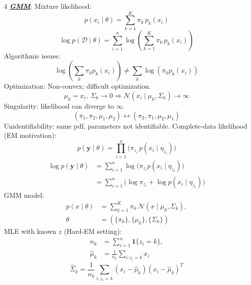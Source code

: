 \documentclass[12pt]{article}
\newcommand{\bulletPoint}[1]{\ul{\textit{\textbf{#1}}}}
\begin{document}
\begin{multicols*}{4}
\bulletPoint{GMM}:
Mixture likelihood:
\useshortskip \begin{equation*}
    p(x_i\mid\theta)=\sum_{k=1}^{K}\pi_k\,p_k(x_i)
\end{equation*}
\useshortskip \begin{equation*}
    \log p(\mathcal{D}\mid\theta)=
    \sum_{i=1}^{n}\log\!\left(\sum_{k=1}^{K}\pi_k\,p_k(x_i)\right)
\end{equation*}
Algorithmic issues:
\useshortskip \begin{equation*}
    \log\!\left(\sum_k \pi_k p_k(x_i)\right)\neq
    \sum_k \log(\pi_k p_k(x_i))
\end{equation*}
Optimization: Non-convex; difficult optimization.
\useshortskip \begin{equation*}
    \mu_k=x_i,\ \Sigma_k\to 0
    \Rightarrow \mathcal{N}(x_i\mid\mu_k,\Sigma_k)\to\infty
\end{equation*}
Singularity: likelihood can diverge to $\infty$.
\useshortskip \begin{equation*}
    (\pi_1,\pi_2,\mu_1,\mu_2)\leftrightarrow
    (\pi_2,\pi_1,\mu_2,\mu_1)
\end{equation*}
Unidentifiability: same pdf, parameters not identifiable.
Complete-data likelihood (EM motivation):
\useshortskip \begin{equation*}
    p(\mathbf{y}\mid\theta)=
    \prod_{i=1}^{n}\Big(\pi_{z_i}\,p(x_i\mid\eta_{z_i})\Big)
\end{equation*}
\useshortskip \begin{equation*}
    \begin{split}
        \log p(\mathbf{y}\mid\theta)
        &=\sum_{i=1}^{n}\log\!\Big(\pi_{z_i}p(x_i\mid\eta_{z_i})\Big)\\
        &=\sum_{i=1}^{n}\Big(\log\pi_{z_i}+\log p(x_i\mid\eta_{z_i})\Big)
    \end{split}
\end{equation*}
GMM model:
\useshortskip \begin{equation*}
    \begin{split}
        p(x\mid\theta)
        &=\sum_{k=1}^{K}\pi_k\,\mathcal{N}(x\mid\mu_k,\Sigma_k),\\
        \theta&=(\{\pi_k\},\{\mu_k\},\{\Sigma_k\})
    \end{split}
\end{equation*}
MLE with known $z$ (Hard-EM setting):
\useshortskip \begin{equation*}
    \begin{split}
        n_k&=\sum_{i=1}^{n}\mathbf{1}\{z_i=k\},\\
        \hat{\mu}_k&=\frac{1}{n_k}\sum_{i:z_i=k}x_i
    \end{split}
\end{equation*}
\useshortskip \begin{equation*}
    \hat{\Sigma}_k=\frac{1}{n_k}
    \sum_{i:z_i=k}(x_i-\hat{\mu}_k)(x_i-\hat{\mu}_k)^T
\end{equation*}


\end{multicols*}
\end{document}
